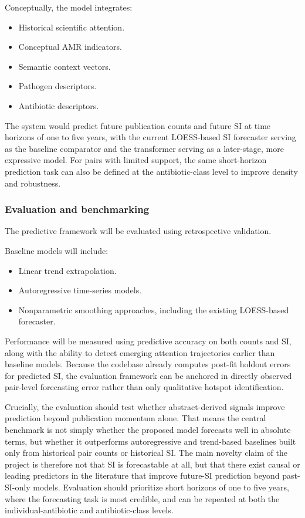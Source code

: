 \documentclass[
]{article}
\providecommand{\tightlist}{%
  \setlength{\itemsep}{0pt}\setlength{\parskip}{0pt}}
\begin{document}
Conceptually, the model integrates:

\begin{itemize}
\tightlist
\item
  Historical scientific attention.
\item
  Conceptual AMR indicators.
\item
  Semantic context vectors.
\item
  Pathogen descriptors.
\item
  Antibiotic descriptors.
\end{itemize}

The system would predict future publication counts and future SI at time
horizons of one to five years, with the current LOESS-based SI
forecaster serving as the baseline comparator and the transformer
serving as a later-stage, more expressive model. For pairs with limited
support, the same short-horizon prediction task can also be defined at
the antibiotic-class level to improve density and robustness.

\subsubsection{Evaluation and
benchmarking}\label{46-evaluation-and-benchmarking}

The predictive framework will be evaluated using retrospective
validation.

Baseline models will include:

\begin{itemize}
\tightlist
\item
  Linear trend extrapolation.
\item
  Autoregressive time-series models.
\item
  Nonparametric smoothing approaches, including the existing LOESS-based
  forecaster.
\end{itemize}

Performance will be measured using predictive accuracy on both counts
and SI, along with the ability to detect emerging attention trajectories
earlier than baseline models. Because the codebase already computes
post-fit holdout errors for predicted SI, the evaluation framework can
be anchored in directly observed pair-level forecasting error rather
than only qualitative hotspot identification.

Crucially, the evaluation should test whether abstract-derived signals
improve prediction beyond publication momentum alone. That means the
central benchmark is not simply whether the proposed model forecasts
well in absolute terms, but whether it outperforms autoregressive and
trend-based baselines built only from historical pair counts or
historical SI. The main novelty claim of the project is therefore not
that SI is forecastable at all, but that there exist causal or leading
predictors in the literature that improve future-SI prediction beyond
past-SI-only models. Evaluation should prioritize short horizons of one
to five years, where the forecasting task is most credible, and can be
repeated at both the individual-antibiotic and antibiotic-class levels.
\end{document}
